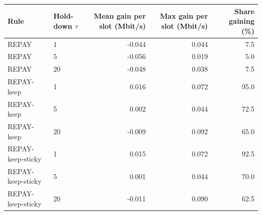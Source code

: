 \begin{tabular}{llrrr}
\toprule
Rule & Hold-down $\tau$ & Mean gain per slot (Mbit/s) & Max gain per slot (Mbit/s) & Share gaining (\%) \\
\midrule
REPAY & 1 & -0.044 & 0.044 & 7.5 \\
REPAY & 5 & -0.056 & 0.019 & 5.0 \\
REPAY & 20 & -0.048 & 0.038 & 7.5 \\
\midrule
REPAY-keep & 1 & 0.016 & 0.072 & 95.0 \\
REPAY-keep & 5 & 0.002 & 0.044 & 72.5 \\
REPAY-keep & 20 & -0.009 & 0.092 & 65.0 \\
\midrule
REPAY-keep-sticky & 1 & 0.015 & 0.072 & 92.5 \\
REPAY-keep-sticky & 5 & 0.001 & 0.044 & 70.0 \\
REPAY-keep-sticky & 20 & -0.011 & 0.090 & 62.5 \\
\bottomrule
\end{tabular}
